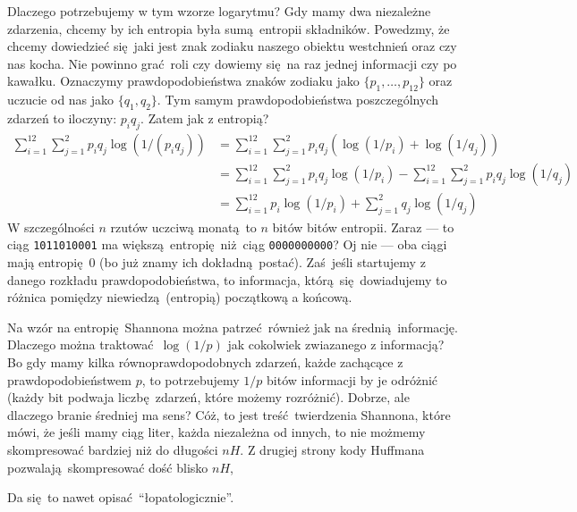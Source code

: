 \documentclass[10pt,a4paper]{article}
\begin{document}
Dlaczego potrzebujemy w tym wzorze logarytmu? 
Gdy mamy dwa niezależne zdarzenia, chcemy by ich entropia była sumą entropii składników.
%
%
Powedzmy, że chcemy dowiedzieć się jaki jest znak zodiaku naszego obiektu westchnień oraz czy nas kocha. Nie powinno grać roli czy dowiemy się na raz jednej informacji czy po kawałku.
Oznaczymy prawdopodobieństwa znaków zodiaku jako $\{p_1, \ldots, p_{12} \}$ oraz uczucie od nas jako $\{q_1, q_2\}$. Tym samym prawdopodobieństwa poszczególnych zdarzeń to iloczyny: $p_i q_j$. Zatem jak z entropią?
%
\begin{align}
    \sum_{i=1}^{12} \sum_{j=1}^2 p_i q_j \log(1/(p_i q_j))
    &= \sum_{i=1}^{12} \sum_{j=1}^2 p_i q_j \left( \log(1/p_i) + \log(1/q_j) \right)\\
    &= \sum_{i=1}^{12} \sum_{j=1}^2 p_i q_j \log(1/p_i)
    -\sum_{i=1}^{12} \sum_{j=1}^2 p_i q_j \log(1/q_j)\\
    &= \sum_{i=1}^{12} p_i \log(1/p_i)
    + \sum_{j=1}^2 q_j \log(1/q_j)
\end{align}
%
W szczególności $n$ rzutów uczciwą monatą to $n$ bitów bitów entropii.
Zaraz --- to ciąg \texttt{1011010001} ma większą entropię niż ciąg \texttt{0000000000}? 
Oj nie --- oba ciągi mają entropię $0$ (bo już znamy ich dokładną postać).
Zaś jeśli startujemy z danego rozkładu prawdopodobieństwa, to informacja, którą się dowiadujemy to różnica pomiędzy niewiedzą (entropią) początkową a końcową.

Na wzór na entropię Shannona można patrzeć również jak na średnią informację.
Dlaczego można traktować $\log(1/p)$ jak cokolwiek zwiazanego z informacją?
Bo gdy mamy kilka równoprawdopodobnych zdarzeń, każde zachącące z prawdopodobieństwem $p$,
to potrzebujemy $1/p$ bitów informacji by je odróżnić (każdy bit podwaja liczbę zdarzeń, które możemy rozróżnić).
Dobrze, ale dlaczego branie średniej ma sens?
Cóż, to jest treść twierdzenia Shannona, które mówi, że jeśli mamy ciąg liter, każda niezależna od innych, to nie możmemy skompresować bardziej niż do długości $n H$.
Z drugiej strony kody Huffmana pozwalają skompresować dość blisko $n H$,

Da się to nawet opisać ``łopatologicznie''.
\end{document}
